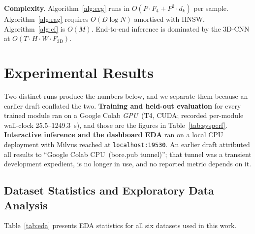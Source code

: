 \documentclass[AMA,STIX1COL,]{WileyNJD-v2}
\begin{document}
\noindent\textbf{Complexity.} Algorithm~\ref{alg:ecg} runs in
$O(P\cdot F_4+P^2\cdot d_k)$ per sample. Algorithm~\ref{alg:rag}
requires $O(D\log N)$ amortised with HNSW. Algorithm~\ref{alg:cf}
is $O(M)$. End-to-end inference is dominated by the 3D-CNN at
$O(T\cdot H\cdot W\cdot F_{\mathrm{3D}})$.

\section{Experimental Results}
\label{sec:results}

Two distinct runs produce the numbers below, and we separate them
because an earlier draft conflated the two. \textbf{Training and
held-out evaluation} for every trained module ran on a Google Colab
\emph{GPU}~(T4, CUDA; recorded per-module wall-clock 25.5--1249.3~s),
and those are the figures in Table~\ref{tab:sysperf}. \textbf{Interactive
inference and the dashboard EDA} ran on a local CPU deployment with
Milvus reached at \texttt{localhost:19530}. An earlier draft attributed
all results to ``Google Colab CPU~(bore.pub tunnel)''; that tunnel was
a transient development expedient, is no longer in use, and no reported
metric depends on it.

\subsection{Dataset Statistics and Exploratory Data Analysis}

Table~\ref{tab:eda} presents EDA statistics for all six datasets
used in this work.
\end{document}
